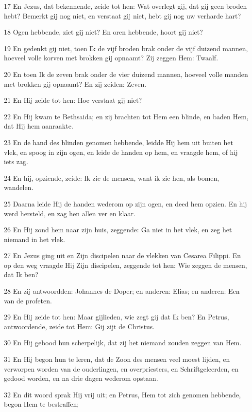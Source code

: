 \par 17 En Jezus, dat bekennende, zeide tot hen: Wat overlegt gij, dat gij geen broden hebt? Bemerkt gij nog niet, en verstaat gij niet, hebt gij nog uw verharde hart?
\par 18 Ogen hebbende, ziet gij niet? En oren hebbende, hoort gij niet?
\par 19 En gedenkt gij niet, toen Ik de vijf broden brak onder de vijf duizend mannen, hoeveel volle korven met brokken gij opnaamt? Zij zeggen Hem: Twaalf.
\par 20 En toen Ik de zeven brak onder de vier duizend mannen, hoeveel volle manden met brokken gij opnaamt? En zij zeiden: Zeven.
\par 21 En Hij zeide tot hen: Hoe verstaat gij niet?
\par 22 En Hij kwam te Bethsaida; en zij brachten tot Hem een blinde, en baden Hem, dat Hij hem aanraakte.
\par 23 En de hand des blinden genomen hebbende, leidde Hij hem uit buiten het vlek, en spoog in zijn ogen, en leide de handen op hem, en vraagde hem, of hij iets zag.
\par 24 En hij, opziende, zeide: Ik zie de mensen, want ik zie hen, als bomen, wandelen.
\par 25 Daarna leide Hij de handen wederom op zijn ogen, en deed hem opzien. En hij werd hersteld, en zag hen allen ver en klaar.
\par 26 En Hij zond hem naar zijn huis, zeggende: Ga niet in het vlek, en zeg het niemand in het vlek.
\par 27 En Jezus ging uit en Zijn discipelen naar de vlekken van Cesarea Filippi. En op den weg vraagde Hij Zijn discipelen, zeggende tot hen: Wie zeggen de mensen, dat Ik ben?
\par 28 En zij antwoordden: Johannes de Doper; en anderen: Elias; en anderen: Een van de profeten.
\par 29 En Hij zeide tot hen: Maar gijlieden, wie zegt gij dat Ik ben? En Petrus, antwoordende, zeide tot Hem: Gij zijt de Christus.
\par 30 En Hij gebood hun scherpelijk, dat zij het niemand zouden zeggen van Hem.
\par 31 En Hij begon hun te leren, dat de Zoon des mensen veel moest lijden, en verworpen worden van de ouderlingen, en overpriesters, en Schriftgeleerden, en gedood worden, en na drie dagen wederom opstaan.
\par 32 En dit woord sprak Hij vrij uit; en Petrus, Hem tot zich genomen hebbende, begon Hem te bestraffen;
